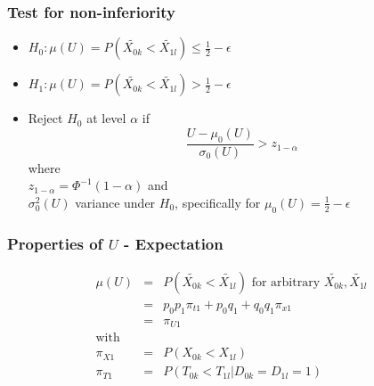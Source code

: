 \documentclass[xcolor=pdftex,dvipsnames,table]{beamer}\usepackage[]{graphicx}\usepackage[]{color}
\begin{document}
\begin{frame} %
\frametitle{Test for non-inferiority}
\begin{itemize}
  \item $H_0:  
  \mu(U) = P(\tilde{X_{0k}} < \tilde{X_{1l}}) \leq \frac{1}{2} - \epsilon$ \\
  \item $H_1:  \mu(U) = P(\tilde{X_{0k}} < \tilde{X_{1l}}) > \frac{1}{2} - \epsilon $ \\
  \item Reject $H_0$ at level $\alpha$ if
        $$ \frac{U - \mu_0(U)}{\sigma_0(U)}  > z_{1-\alpha} $$ 
        where \\
        $z_{1-\alpha} = \Phi^{-1}({1-\alpha})$ and \\
        $\sigma_0^2(U)$  variance under $H_0$, specifically for 
        $ \mu_0(U) =  \frac{1}{2} - \epsilon$ 
\end{itemize}
\end{frame}



\begin{frame} %
\frametitle{Properties of $U$ - Expectation}
\begin{eqnarray*}
  \mu(U) & = & P(\tilde{X_{0k}} < \tilde{X_{1l}})  \mbox{ for arbitrary } \tilde{X_{0k}}, \tilde{X_{1l}} \\
         & = & p_0 p_1 \pi_{t1} + p_0 q_1 + q_0 q_1 \pi_{x1} \\
         & = & \pi_{U1}\\
  \mbox{with}   &   & \\
  \pi_{X1} & = & P(X_{0k} < X_{1l}) \\
  \pi_{T1} & = & P(T_{0k} < T_{1l} | D_{0k} = D_{1l} = 1)
\end{eqnarray*}
\end{frame}
\end{document}
